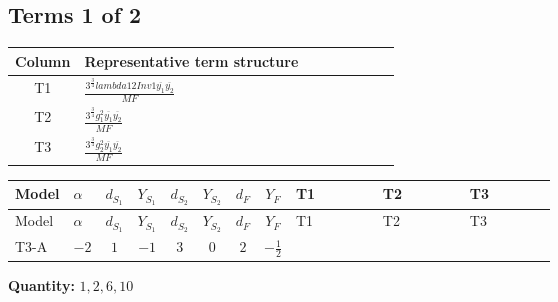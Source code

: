 \documentclass[8pt]{article}
\begin{document}
\begin{landscape}
\subsection*{Terms 1 of 2}
\begin{center}
\begin{tabular}{@{}c >{\raggedright\arraybackslash}p{0.82\linewidth}@{}}
\toprule
Column & Representative term structure \\
\midrule
T1 & \(\displaystyle \frac{3^{\frac{3}{4}} lambda12Inv1 \overline{y_{1}} \overline{y_{2}}}{MF}\) \\
\midrule
T2 & \(\displaystyle \frac{3^{\frac{3}{4}} g_{1}^{2} \overline{y_{1}} \overline{y_{2}}}{MF}\) \\
\midrule
T3 & \(\displaystyle \frac{3^{\frac{3}{4}} g_{2}^{2} \overline{y_{1}} \overline{y_{2}}}{MF}\) \\
\midrule
\bottomrule
\end{tabular}
\end{center}
\smallskip
\tiny
\begin{longtable}{@{}llcccccc >{\raggedright\arraybackslash}p{0.21\linewidth} >{\raggedright\arraybackslash}p{0.21\linewidth} >{\raggedright\arraybackslash}p{0.21\linewidth}@{}}
\toprule
Model & $\alpha$ & $d_{S_1}$ & $Y_{S_1}$ & $d_{S_2}$ & $Y_{S_2}$ & $d_F$ & $Y_F$ & T1 & T2 & T3 \\
\midrule
\endfirsthead
\toprule
Model & $\alpha$ & $d_{S_1}$ & $Y_{S_1}$ & $d_{S_2}$ & $Y_{S_2}$ & $d_F$ & $Y_F$ & T1 & T2 & T3 \\
\midrule
\endhead
T3-A & $-2$ & $1$ & $-1$ & $3$ & $0$ & $2$ & $-\frac{1}{2}$ & \scriptsize\adjustbox{max width=\linewidth}{$\begin{gathered} \frac{3^{\frac{3}{4}} lambda12Inv1 \overline{y_{1}} \overline{y_{2}}}{6 MF}\end{gathered}$} & \scriptsize\adjustbox{max width=\linewidth}{$\begin{gathered} \frac{3^{\frac{3}{4}} g_{1}^{2} \overline{y_{1}} \overline{y_{2}}}{8 MF}\end{gathered}$} & \scriptsize\adjustbox{max width=\linewidth}{$\begin{gathered} \frac{25 \cdot 3^{\frac{3}{4}} g_{2}^{2} \overline{y_{1}} \overline{y_{2}}}{24 MF}\end{gathered}$} \\
\midrule
\bottomrule
\end{longtable}
\clearpage
\noindent\textbf{Quantity: }$\mathrm{1,2,6,10}$\par\smallskip

\end{landscape}
\end{document}
